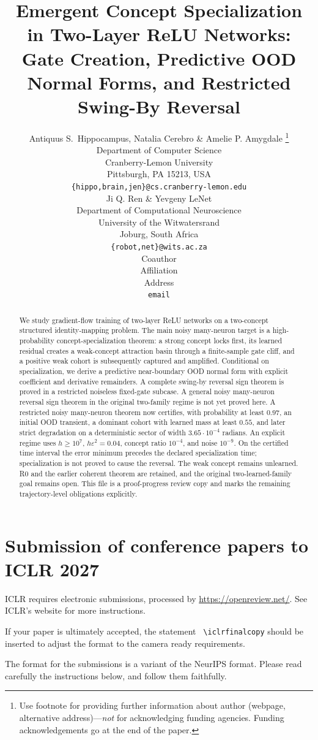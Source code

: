\documentclass{article} %
\title{Emergent Concept Specialization in Two-Layer ReLU Networks:\\Gate Creation, Predictive OOD Normal Forms, and Restricted Swing-By Reversal}
\author{Antiquus S.~Hippocampus, Natalia Cerebro \& Amelie P. Amygdale \thanks{ Use footnote for providing further information
about author (webpage, alternative address)---\emph{not} for acknowledging
funding agencies.  Funding acknowledgements go at the end of the paper.} \\
Department of Computer Science\\
Cranberry-Lemon University\\
Pittsburgh, PA 15213, USA \\
\texttt{\{hippo,brain,jen\}@cs.cranberry-lemon.edu} \\
\And
Ji Q. Ren \& Yevgeny LeNet \\
Department of Computational Neuroscience \\
University of the Witwatersrand \\
Joburg, South Africa \\
\texttt{\{robot,net\}@wits.ac.za} \\
\AND
Coauthor \\
Affiliation \\
Address \\
\texttt{email}
}
\theoremstyle{plain}
\theoremstyle{definition}
\theoremstyle{remark}
\begin{document}
\maketitle

\begin{abstract}
We study gradient-flow training of two-layer ReLU networks on a two-concept
structured identity-mapping problem.  The main noisy many-neuron target is a
high-probability concept-specialization theorem: a strong concept locks first,
its learned residual creates a weak-concept attraction basin through a
finite-sample gate cliff, and a positive weak cohort is subsequently captured
and amplified.  Conditional on specialization, we derive a predictive
near-boundary OOD normal form with explicit coefficient and derivative
remainders.  A complete swing-by reversal sign theorem is proved in a
restricted noiseless fixed-gate subcase.  A general noisy many-neuron reversal
sign theorem in the original two-family regime is not yet proved here.
A restricted noisy many-neuron theorem now certifies, with probability at
least $0.97$, an initial OOD transient, a dominant cohort with learned mass
at least $0.55$, and later strict degradation on a deterministic sector of
width $3.65\cdot10^{-4}$ radians. An explicit regime uses $h\ge10^7$,
$h\varepsilon^2=0.04$, concept ratio $10^{-4}$, and noise $10^{-9}$.
On the certified time interval the error minimum precedes the declared
specialization time; specialization is not proved to cause the reversal.
The weak concept remains unlearned. R0 and the earlier coherent theorem
are retained, and the original two-learned-family goal remains open. This file is a proof-progress
review copy and marks the remaining trajectory-level obligations explicitly.
\end{abstract}

\section{Submission of conference papers to ICLR 2027}

ICLR requires electronic submissions, processed by
\url{https://openreview.net/}. See ICLR's website for more instructions.

If your paper is ultimately accepted, the statement {\tt
  {\textbackslash}iclrfinalcopy} should be inserted to adjust the
format to the camera ready requirements.

The format for the submissions is a variant of the NeurIPS format.
Please read carefully the instructions below, and follow them
faithfully.
\end{document}
